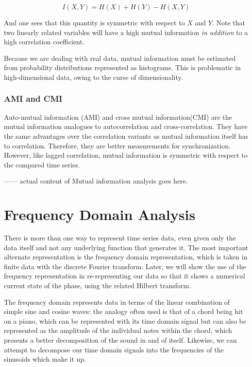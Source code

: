 \documentclass[12pt]{article}
\begin{document}
$$I(X, Y) = H(X) + H(Y) - H(X, Y)$$

And one sees that this quantity is symmetric with respect to $X$ and $Y$. Note that two linearly related variables will have a high mutual information \emph{in addition} to a high correlation coefficient.

Because we are dealing with real data, mutual information must be estimated from probability distributions represented as histograms. This is problematic in high-dimensional data, owing to the curse of dimensionality\cite{bellman}.%

\subsubsection{AMI and CMI}

Auto-mutual information (AMI) and cross mutual information(CMI) are the mutual information analogues to autocorrelation and cross-correlation. They have the same advantages over the correlation variants as mutual information itself has to correlation. Therefore, they are better measurements for synchronization. However, like lagged correlation, mutual information is symmetric with respect to the compared time series.

------ actual content of Mutual information analysis goes here.

\section{Frequency Domain Analysis}

There is more than one way to represent time series data, even given only the data itself and not any underlying function that generates it. The most important alternate representation is the frequency domain representation, which is taken in finite data with the discrete Fourier transform. Later, we will show the use of the frequency representation in re-representing our data so that it shows a numerical current state of the phase, using the related Hilbert transform.

The frequency domain represents data in terms of the linear combination of simple sine and cosine waves: the analogy often used is that of a chord being hit on a piano, which can be represented with its time domain signal but can also be represented as the amplitude of the individual notes within the chord, which presents a better decomposition of the sound in and of itself. Likewise, we can attempt to decompose our time domain signals into the frequencies of the sinusoids which make it up.
\end{document}
